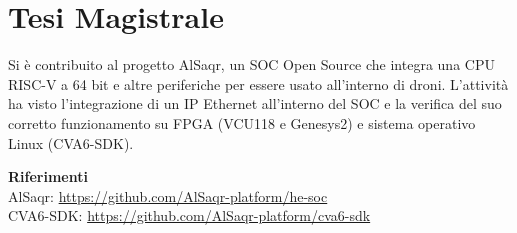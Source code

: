 \section{Tesi Magistrale}

Si è contribuito al progetto AlSaqr, un SOC Open Source che integra una CPU
RISC-V a 64 bit e altre periferiche per essere usato all'interno di droni.
L'attività ha visto l'integrazione di un IP Ethernet all'interno del SOC e la
verifica del suo corretto funzionamento su FPGA (VCU118 e Genesys2) e sistema
operativo Linux (CVA6-SDK).

\vspace{2mm}
\textbf{Riferimenti} \\
AlSaqr: \url{https://github.com/AlSaqr-platform/he-soc} \\
CVA6-SDK: \url{https://github.com/AlSaqr-platform/cva6-sdk}
